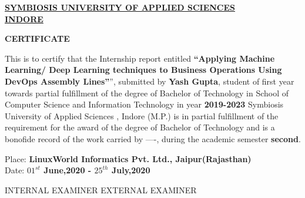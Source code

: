 \documentclass[12pt,oneside,a4paper]{report}
\begin{document}
\newpage

\begin{large}
\begin{center}
\fontsize{18pt}{10pt}\selectfont
\underline{\textbf{SYMBIOSIS UNIVERSITY OF APPLIED SCIENCES}}\\
\vspace{5.0mm}\underline{\textbf{INDORE}}
\end{center}
\end{large}
\vspace{0.35in}
\begin{large}
\begin{center}
\fontsize{16pt}{10pt}\selectfont
\textbf{CERTIFICATE}
\end{center}
\end{large}
\vspace{0.8in}
\doublespacing
\noindent This is to certify that the Internship report entitled \textbf{“Applying Machine Learning/ Deep Learning techniques to Business Operations Using DevOps Assembly Lines”}”, submitted by \textbf{Yash Gupta}, student of first year towards
partial fulfillment of the degree of Bachelor of Technology in School of Computer Science and Information Technology in year \textbf{2019-2023} Symbiosis University of Applied Sciences , Indore (M.P.) is in partial fulfillment of the requirement for the award of the degree of Bachelor of Technology and is a bonofide record of the work carried by ----, during the academic semester \textbf{second}.

\vspace{1.0in}\raggedright
Place: \textbf{LinuxWorld Informatics Pvt. Ltd., Jaipur(Rajasthan)}\\Date: \textbf{$01^{st}$ June,2020 - $25^{th}$ July,2020}\vspace{1.0in}\\ \vspace{25mm}
\raggedright INTERNAL EXAMINER  \hspace{3.4in}EXTERNAL EXAMINER
\end{document}
